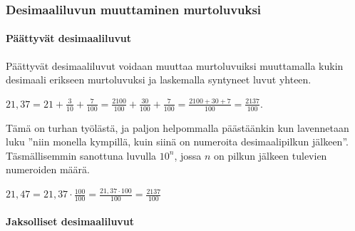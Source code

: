 
\subsubsection*{Desimaaliluvun muuttaminen murtoluvuksi}

\paragraph*{Päättyvät desimaaliluvut}

Päättyvät desimaaliluvut voidaan muuttaa murtoluvuiksi muuttamalla kukin
desimaali erikseen murtoluvuksi ja laskemalla syntyneet luvut yhteen.

\begin{esimerkki}
$21,37 = 21+ \frac{3}{10}+\frac{7}{100} =
\frac{2100}{100}+\frac{30}{100}+\frac{7}{100}
 = \frac{2100+30+7}{100} = \frac{2137}{100}.$
\end{esimerkki}

Tämä on turhan työlästä, ja paljon helpommalla päästäänkin kun lavennetaan luku ''niin monella kympillä, kuin siinä on numeroita desimaalipilkun jälkeen''. Täsmällisemmin sanottuna luvulla $10^n$, jossa $n$ on pilkun jälkeen tulevien numeroiden määrä.

\begin{esimerkki}
$21,47 = 21,37 \cdot  \frac{100}{100} = \frac{21,37 \cdot 100}{100} = \frac{2137}{100}$
\end{esimerkki}



\paragraph*{Jaksolliset desimaaliluvut}

